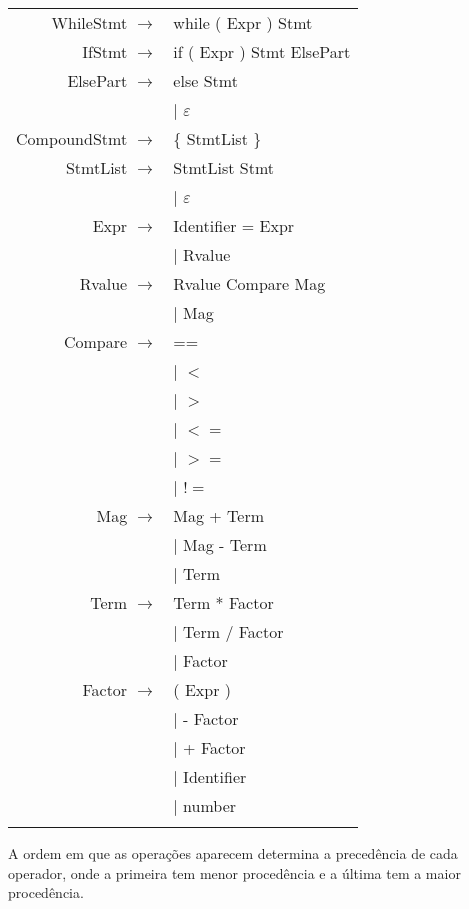 \documentclass[12pt]{article}
\begin{document}
\begin{longtable}{ r l }
	WhileStmt		$\rightarrow$ 	& while ( Expr ) Stmt \\
	IfStmt			$\rightarrow$ 	& if ( Expr ) Stmt ElsePart \\
	ElsePart		$\rightarrow$ 	& else Stmt \\
									& $|$ $\varepsilon$ \\
	CompoundStmt	$\rightarrow$ 	& \{ StmtList \} \\
	StmtList		$\rightarrow$ 	& StmtList Stmt \\
									& $|$ $\varepsilon$ \\
	Expr			$\rightarrow$ 	& Identifier = Expr \\
									& $|$ Rvalue \\
	Rvalue			$\rightarrow$ 	& Rvalue Compare Mag \\
									& $|$ Mag \\
	Compare			$\rightarrow$ 	& ==  \\
									& $|$ $<$ \\
									& $|$ $>$ \\
									& $|$ $<=$ \\
									& $|$ $>=$ \\
									& $|$ $!=$ \\
	Mag				$\rightarrow$ 	& Mag + Term \\
									& $|$ Mag - Term \\
									& $|$ Term \\
	Term			$\rightarrow$ 	& Term * Factor \\
									& $|$ Term / Factor \\
									& $|$ Factor \\
	Factor			$\rightarrow$ 	& ( Expr ) \\
									& $|$  - Factor \\
									& $|$  + Factor \\
									& $|$  Identifier \\
									& $|$  number \\ \\
\end{longtable}
		

A ordem em que as operações aparecem determina a precedência de cada operador, onde a primeira tem menor procedência e a última tem a maior procedência.
\end{document}
